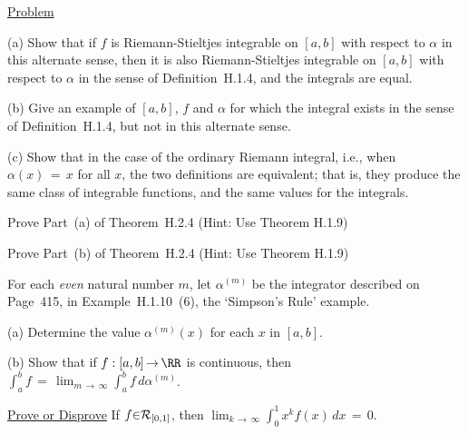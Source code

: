 \V

        \underline{Problem}

\V

        (a) Show that if $f$ is Riemann-Stieltjes integrable on $[a,b]$ with respect to ${\alpha}$ in this alternate sense,
    then it is also Riemann-Stieltjes integrable on $[a,b]$ with respect to ${\alpha}$ in the sense of Definition~H.1.4, and the integrals are equal.

\V

        (b) Give an example of $[a,b]$, $f$ and ${\alpha}$ for which the integral exists in the sense of Definition~H.1.4, but not in this alternate sense.

\V      (c) Show that in the case of the ordinary Riemann integral, i.e., when ${\alpha}(x) \,=\, x$ for all $x$,
    the two definitions are equivalent; that is, they produce the same class of integrable functions, and the same values for the integrals.


\V
\V

\noindent \ExHb Prove Part~(a) of Theorem~H.2.4 (Hint: Use Theorem H.1.9)

\V
\V

\noindent \ExHc Prove Part~(b) of Theorem~H.2.4 (Hint: Use Theorem H.1.9)

\V
\V

\noindent \ExHd For each {\em even} natural number $m$, let ${\alpha}^{(m)}$ be the integrator described on Page~415,
    in Example~H.1.10~(6), the `Simpson's Rule' example.

\V

        (a) Determine the value ${\alpha}^{(m)}(x)$ for each $x$ in $[a,b]$.

\V

        (b) Show that if $f:[a,b] \,{\rightarrow}\, {\RR}$ is continuous, then ${\displaystyle \int_{a}^{b} f \,=\, \lim_{m \,{\rightarrow}\, {\infty}} \int_{a}^{b} f\,d{\alpha}^{(m)}}$.


\V
\V


\noindent \ExHe \underline{Prove or Disprove} If $f{\in}{\cal R}_{[0,1]}$, then ${\displaystyle \lim_{k \,{\rightarrow}\, {\infty}} \int_{0}^{1} x^{k}f(x)\,dx \,=\, 0}$.

